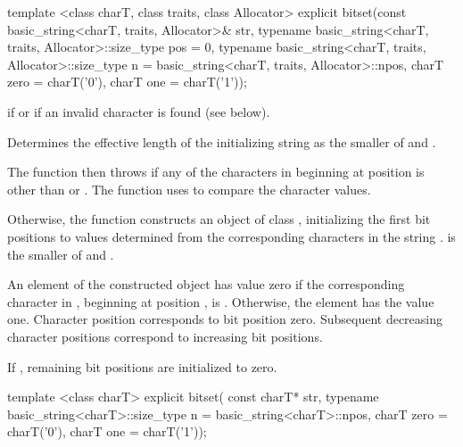 \begin{itemdecl}
template <class charT, class traits, class Allocator>
explicit
bitset(const basic_string<charT, traits, Allocator>& str,
       typename basic_string<charT, traits, Allocator>::size_type pos = 0,
       typename basic_string<charT, traits, Allocator>::size_type n =
         basic_string<charT, traits, Allocator>::npos,
         charT zero = charT('0'), charT one = charT('1'));
\end{itemdecl}

\begin{itemdescr}
\pnum
\throws
{}
if
or  if an invalid character is found (see below).%

\pnum
\effects
Determines the effective length
 of the initializing string as the smaller of
 and
.

The function then throws%
if any of the 
characters in  beginning at position  is
other than  or . The function uses 
to compare the character values.

Otherwise, the function constructs an object of class
,
initializing the first  bit
positions to values determined from the corresponding characters in the string
.
 is the smaller of  and .

\pnum
An element of the constructed object has value zero if the
corresponding character in , beginning at position
, is
.
Otherwise, the element has the value one.
Character position  corresponds to bit position zero.
Subsequent decreasing character positions correspond to increasing bit positions.

\pnum
If , remaining bit positions are initialized to zero.
\end{itemdescr}

\begin{itemdecl}
template <class charT>
  explicit bitset(
    const charT* str,
    typename basic_string<charT>::size_type n = basic_string<charT>::npos,
    charT zero = charT('0'), charT one = charT('1'));
\end{itemdecl}

